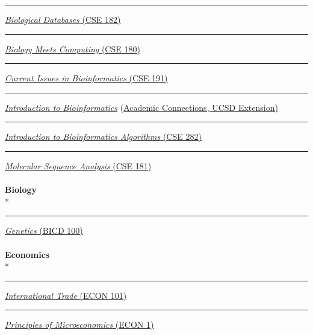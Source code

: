 \documentclass[margin,line]{res}
\begin{document}
\begin{resume}
\rule{-1mm}{5mm} \hspace*{4mm} \href{http://proteomics.ucsd.edu/vbafna/teaching-2/cse182-biological-data-analysis/}{\textit{Biological Databases} (CSE 182)}\\
\rule{-1mm}{5mm} \hspace*{4mm} \href{http://ucsd.edu/catalog/courses/CSE.html#cse180}{\textit{Biology Meets Computing} (CSE 180)}\\
\rule{-1mm}{5mm} \hspace*{4mm} \href{http://ucsd.edu/catalog/courses/CSE.html#cse191}{\textit{Current Issues in Bioinformatics} (CSE 191)}\\
\rule{-1mm}{5mm} \hspace*{4mm} \textit{\href{https://academicconnections.ucsd.edu/courses/intro-bioinformatics.html}{Introduction to Bioinformatics}} (\href{https://academicconnections.ucsd.edu/}{Academic Connections, UCSD Extension)}\\
\rule{-1mm}{5mm} \hspace*{4mm} \href{https://sites.google.com/site/ucsdcse282/}{\textit{Introduction to Bioinformatics Algorithms} (CSE 282)}\\
\rule{-1mm}{5mm} \hspace*{4mm} \href{https://sites.google.com/site/ucsdcse181/}{\textit{Molecular Sequence Analysis} (CSE 181)}\\
~\\
\textbf{Biology}\\*
\rule{-1mm}{5mm} \hspace*{4mm} \href{http://ucsd.edu/catalog/courses/BIOL.html#bicd100}{\textit{Genetics} (BICD 100)}\\
~\\
\textbf{Economics}\\*
\rule{-1mm}{5mm} \hspace*{4mm} \href{http://ucsd.edu/catalog/courses/ECON.html#econ101}{\textit{International Trade} (ECON 101)}\\
\rule{-1mm}{5mm} \hspace*{4mm} \href{http://ucsd.edu/catalog/courses/ECON.html#econ1}{\textit{Principles of Microeconomics} (ECON 1)}\\


\end{resume}
\end{document}
